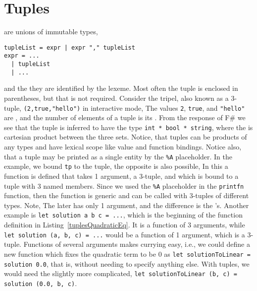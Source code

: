 \section{Tuples}
 are unions of immutable types, 
%
\begin{lstlisting}[language=ebnf]
tupleList = expr | expr "," tupleList
expr = ... 
  | tupleList
  | ...
\end{lstlisting}
%
and the they are identified by the \lexeme{,} lexeme. Most often the tuple is enclosed in parentheses, but that is not required. Consider the tripel, also known as a 3-tuple, \lstinline!(2,true,"hello")! in interactive mode,
%
%
The values \lstinline!2!, \lstinline!true!, and \lstinline!"hello"! are , and the number of elements of a tuple is its . From the response of F\# we see that the tuple is inferred to have the type \lstinline!int * bool * string!, where the \lexeme{*} is cartesian product between the three sets.  Notice, that tuples can be products of any types and have lexical scope like value and function bindings. Notice also, that a tuple may be printed as a single entity by the \lstinline!%A! placeholder. In the example, we bound \lstinline!tp! to the tuple, the opposite is also possible,
%
%
In this a function is defined that takes 1 argument, a 3-tuple, and which is bound to a tuple with 3 named members. Since we used the \lstinline!%A! placeholder in the \lstinline!printfn! function, then the function is generic and can be called with 3-tuples of different types. Note,   The later has only 1 argument, and the difference is the \lexeme{,}'s. Another example is \lstinline!let solution a b c = ...!, which is the beginning of the function definition in Listing~\ref{tuplesQuadraticEq}. It is a function of 3 arguments, while \lstinline!let solution (a, b, c) = ...! would be a function of 1 argument, which is a 3-tuple. Functions of several arguments makes currying easy, i.e., we could define a new function which fixes the quadratic term to be 0 as \lstinline!let solutionToLinear = solution 0.0!, that is, without needing to specify anything else. With tuples, we would need the slightly more complicated, \lstinline!let solutionToLinear (b, c) = solution (0.0, b, c)!.

